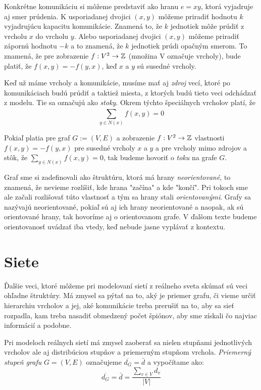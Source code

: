 Konkrétne komunikáciu si môžeme predstaviť ako hranu $e = xy$, ktorá vyjadruje 
aj smer prúdenia. K usporiadanej dvojici $(x, y)$ môžeme priradiť hodnotu $k$ 
vyjadrujúcu kapacitu komunikácie. Znamená to, že $k$ jednotiek môže prúdiť z 
vrcholu $x$ do vrcholu $y$. Alebo usporiadanej dvojici $(x, y)$ môžeme priradiť
zápornú hodnotu $-k$ a to znamená, že $k$ jednotiek prúdi opačným smerom. To 
znamená, že pre zobrazenie $f:V^2\rightarrow\mathbb{Z}$ (množina V označuje vrcholy), 
bude platiť, že $f(x,y) = -f(y,x)$, keď $x$ a $y$ sú susedné vrcholy.

Keď už máme vrcholy a komunikácie, musíme mať aj \emph{zdroj} vecí, ktoré po 
komunikáciach budú prúdiť a taktiež miesta, z ktorých budú tieto veci odchádzať 
z modelu. Tie sa označujú ako \emph{stoky}. Okrem týchto špeciálnych vrcholov 
platí, že $$\sum_{y\in N(x)}^{}{f(x,y) = 0}$$

Pokiaľ platia pre graf $G := (V, E)$ a zobrazenie $f:V^2\rightarrow\mathbb{Z}$ 
vlastnosti $f(x,y) = -f(y,x)$ pre susedné vrcholy $x$ a $y$ a pre vrcholy mimo 
zdrojov a stôk, že $\sum_{y\in N(x)}^{}{f(x,y) = 0}$, tak budeme hovoriť o 
\emph{toku} na grafe $G$.

Graf sme si zadefinovali ako štruktúru, ktorá má hrany \emph{neorientované}, 
to znamená, že nevieme rozlíšiť, kde hrana "začína" a kde "končí". Pri tokoch 
sme ale začali rozlišovať túto vlastnosť a tým sa hrany stali 
\emph{orientovanými}. Grafy sa nazývajú neorientované, pokiaľ sú aj ich hrany 
neorientované a naopak, ak sú orientované hrany, tak hovoríme aj o 
orientovanom grafe. V ďalšom texte budeme orientovanosť uvádzať iba vtedy, keď 
nebude jasne vyplávať z kontextu.

\section{Siete}

Ďalšie veci, ktoré môžeme pri modelovaní sietí z reálneho sveta skúmať sú 
veci ohľadne štruktúry. Má zmysel sa pýtať na to, aký je priemer grafu, či vieme 
určiť hierarchiu vrcholov a jej, aké komunikácie treba prerušiť na to, aby 
sa sieť rozpadla, kam treba nasadiť obmedzený počet špiónov, aby sme získali čo 
najviac informácií a podobne.

Pri modeloch reálnych sietí má zmysel zaoberať sa nielen stupňami jednotlivých 
vrcholov ale aj distribúciou stupňov a priemerným stupňom vrchola. 
\emph{Priemerný stupeň grafu} $G = (V, E)$ označujeme $\overline{d_G} = \bar{d}$ a 
vypočítame ako: $$\overline{d_G} = \bar{d} = \frac{\sum_{v \in V}^{}{d_v}}{|V|}$$


